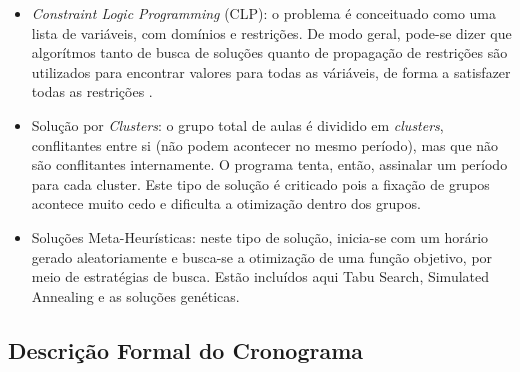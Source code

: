 \documentclass[12pt,a4paper]{article}
\begin{document}
		\begin{itemize}
			\item \textit{Constraint Logic Programming} (CLP): o problema é conceituado como uma lista de variáveis, com domínios e restrições. \cite{badoni} De modo geral, pode-se dizer que algorítmos tanto de busca de soluções quanto de propagação de restrições são utilizados para encontrar valores para todas as váriáveis, de forma a satisfazer todas as restrições \cite{citar_alguém}.
			\item Solução por \textit{Clusters}: o grupo total de aulas é dividido em \textit{clusters}, conflitantes entre si (não podem acontecer no mesmo período), mas que não são conflitantes internamente. O programa tenta, então, assinalar um período para cada cluster. Este tipo de solução é criticado pois a fixação de grupos acontece muito cedo e dificulta a otimização dentro dos grupos. \cite{muller}
			\item Soluções Meta-Heurísticas: neste tipo de solução, inicia-se com um horário gerado aleatoriamente e busca-se a otimização de uma função objetivo, por meio de estratégias de busca. Estão incluídos aqui Tabu Search, Simulated Annealing e as soluções genéticas.
		\end{itemize}

		\subsection{Descrição Formal do Cronograma}


\end{document}
